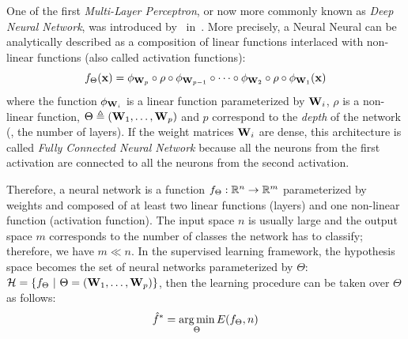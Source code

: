 One of the first \emph{Multi-Layer Perceptron}, or now more commonly known as \emph{Deep Neural Network}, was introduced by~\citeauthor{ivakhnenko1967cybernetics} in~\citeyear{ivakhnenko1967cybernetics}.
More precisely, a Neural Neural can be analytically described as a composition of linear functions interlaced with non-linear functions (also called activation functions):
\begin{equation}
  f_\Theta(\mathbf{x}) = \phi_{\mathbf{W}_p} \circ \rho \circ \phi_{\mathbf{W}_{p-1}} \circ \cdots \circ \phi_{\mathbf{W}_2} \circ \rho \circ \phi_{\mathbf{W}_1}(\mathbf{x})
  \label{equation:neural_network}
\end{equation}
where the function $\phi_{\mathbf{W}_i}$ is a linear function parameterized by $\mathbf{W}_i$, $\rho$ is a non-linear function, $\Theta \triangleq ( \mathbf{W}_1, \dots, \mathbf{W}_p )$ and $p$ correspond to the \emph{depth} of the network (\ie, the number of layers).
If the weight matrices $\mathbf{W}_i$ are dense, this architecture is called \emph{Fully Connected Neural Network} because all the neurons from the first activation are connected to all the neurons from the second activation.

Therefore, a neural network is a function $f_\Theta:\mathbb{R}^n \rightarrow \mathbb{R}^m$ parameterized by weights and composed of at least two linear functions (layers) and one non-linear function (activation function).
The input space $n$ is usually large and the output space $m$ corresponds to the number of classes the network has to classify; therefore, we have $m \ll n$.
In the supervised learning framework, the hypothesis space becomes the set of neural networks parameterized by $\Theta$: $\mathcal{H} = \left\{ f_\Theta \ |\ \Theta = ( \Wmat_1, \dots, \Wmat_p ) \right\}$,
then the learning procedure can be taken over $\Theta$ as follows:
\begin{equation}
  \hat{f}^* = \operatorname*{arg\,min}_{\Theta} E(f_\Theta, n) 
\end{equation}




